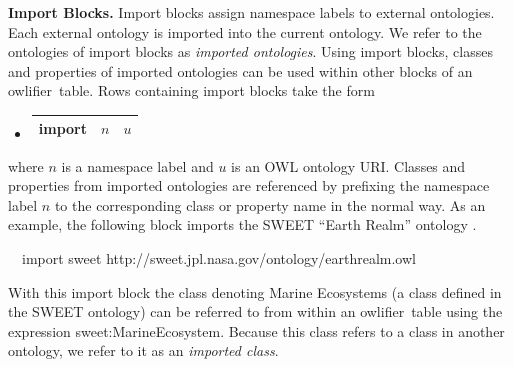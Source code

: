 \documentclass[5p,authoryear]{elsarticle}
\newcommand{\owlifier}{\textsf{owlifier}}
\newcommand{\myblock}[1]{\vspace{12pt}\noindent\textbf{#1}}
\begin{document}
\myblock{Import Blocks.} Import blocks assign namespace labels to
external ontologies. Each external ontology is imported into the
current ontology. We refer to the ontologies of import blocks as
\emph{imported ontologies}.  Using import blocks, classes and
properties of imported ontologies can be used within other blocks of
an \owlifier\ table.  Rows containing import blocks take the form
\begin{itemize}
\item[]
  \begin{tabular}{|l|l|l|}\hline
    \textsf{import} & $n$ & $u$ \\ \hline 
  \end{tabular} 
\end{itemize}
where $n$ is a namespace label and $u$ is an OWL ontology URI. Classes
and properties from imported ontologies are referenced by prefixing
the namespace label $n$ to the corresponding class or property name in
the normal way. As an example, the following block imports the SWEET
``Earth Realm'' ontology \citep{raskin05}.
\begin{small}
\begin{tabbing}
  ~~\textsf{import}  \textsf{sweet} 
  \textsf{http://sweet.jpl.nasa.gov/ontology/earthrealm.owl}
\end{tabbing}
\end{small}
With this import block the class denoting Marine Ecosystems (a class
defined in the SWEET ontology) can be referred to from within an
\owlifier\ table using the expression
\textsf{sweet:MarineEcosystem}. Because this class refers to a class
in another ontology, we refer to it as an \emph{imported class}.
\end{document}

